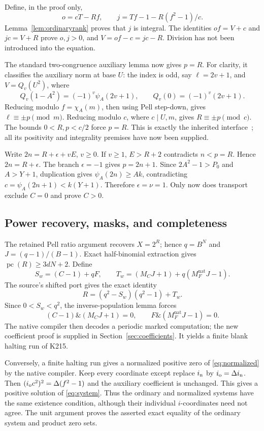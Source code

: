 \documentclass[11pt,a4paper]{article}
\theoremstyle{remark}\newtheorem{remark}[theorem]{Remark}
\newcommand{\pc}{\operatorname{pc}}
\newcommand{\band}{\mathbin{\&}}
\newcommand{\Mnat}{M_F^{\mathrm{nat}}}
\begin{document}
Define, in the proof only,
\[
 o=cT-Rf,\qquad j=Tf-1-R(f^2-1)/c.
\]
Lemma~\ref{lem:ordinaryrank} proves that \(j\) is integral. The identities
\(of=V+c\) and \(jc=V+R\) prove \(o,j>0\), and
\(V=of-c=jc-R\). Division has not been introduced into the equation.

The standard two-congruence auxiliary lemma now gives \(p=R\).
For clarity, it classifies the auxiliary norm at base \(U\): the index
is odd, say \(\ell=2v+1\), and
\(V=Q_v(U^2)\), where
\[
 Q_v(1-A^2)=(-1)^v\psi_A(2v+1),\qquad
 Q_v(0)=(-1)^v(2v+1).
\]
Reducing modulo \(f=\chi_A(m)\), then using Pell step-down, gives
\(\ell\equiv\pm p\pmod m\). Reducing modulo \(c\), where
\(c\mid U,m\), gives \(R\equiv\pm p\pmod c\). The bounds
\(0<R,p<c/2\) force \(p=R\). This is exactly the inherited
interface~\cite{ordinary}; all its positivity and integrality premises
have now been supplied.

Write \(2n=R+\epsilon+vE\), \(v\ge0\). If \(v\ge1\),
\(E>R+2\) contradicts \(n<p=R\). Hence \(2n=R+\epsilon\).
The branch \(\epsilon=-1\) gives \(p=2n+1\). Since
\(2A^2-1>P_0\) and \(A>Y+1\), duplication gives
\(\psi_A(2n)\ge Ak\), contradicting
\(c=\psi_A(2n+1)<k(Y+1)\). Therefore \(\epsilon=\nu=1\).
Only now does transport exclude \(C=0\) and prove \(C>0\).

\subsection{Power recovery, masks, and completeness}
The retained Pell ratio argument recovers \(X=2^R\); hence
\(q=B^N\) and \(J=(q-1)/(B-1)\). Exact half-binomial extraction
gives \(\pc(R)\ge3dN+2\). Define
\[
 S_w=(C-1)+qF,\qquad
 T_w=(M_CJ+1)+q(\Mnat J-1).
\]
The source's shifted port gives the exact identity
\begin{equation}
 R=(q^2-S_w)(q^2-1)+T_w.\label{eq:wordidentity}
\end{equation}
Since \(0<S_w<q^2\), the inverse-population lemma forces
\begin{equation}
 (C-1)\band(M_CJ+1)=0,
 \qquad F\band(\Mnat J-1)=0.\label{eq:masksrecovered}
\end{equation}
The native compiler then decodes a periodic marked computation; the
new coefficient proof is supplied in Section~\ref{sec:coefficients}.
It yields a finite blank halting run of K215.

Conversely, a finite halting run gives a normalized positive zero of
\eqref{eq:normalized} by the native compiler. Keep every coordinate
except replace \(i_{\rm n}\) by \(i_{\rm o}=\Delta i_{\rm n}\).
Then \((i_{\rm o}c^2)^2=\Delta(f^2-1)\) and the auxiliary
coefficient is unchanged. This gives a positive solution of
\eqref{eq:system}. Thus the ordinary and normalized systems have the
same existence condition, although their individual \(i\)-coordinates
need not agree. The unit argument proves the asserted exact equality
of the ordinary system and product zero sets.
\end{document}
